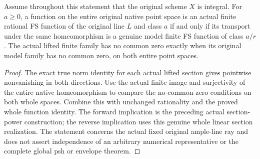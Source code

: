 \begin{theorem}
\label{thm:native-ample-model-finite-fs-iff}
\leanok
{}
Assume throughout this statement that the original scheme $X$ is integral.
For $a\ge0$, a function on the entire original native point space is an actual
finite rational FS function of the original line $L$ and class $a$ if and only
if its transport under the same homeomorphism is a genuine model finite FS
function of class $a/r$. The actual lifted finite family has no common zero
exactly when its original model family has no common zero, on both entire
point spaces.
\end{theorem}
\begin{proof}
The exact true norm identity for each actual lifted section gives pointwise
nonvanishing in both directions. Use the actual finite image and surjectivity
of the entire native homeomorphism to compare the no-common-zero conditions
on both whole spaces. Combine this with unchanged rationality and the proved
whole function identity. The forward implication is the preceding actual
section-power construction; the reverse implication uses this genuine whole
linear section realization. The statement concerns the actual fixed original
ample-line ray and does not assert independence of an arbitrary numerical
representative or the complete global psh or envelope theorem.
\end{proof}
